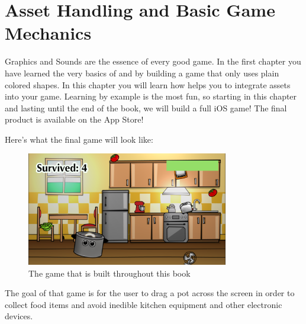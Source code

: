\chapter{Asset Handling and Basic Game Mechanics}

Graphics and Sounds are the essence of every good game. In the first chapter
you have learned the very basics of \SB{} and \cocos{} by building a game that only
uses plain colored shapes. In this chapter you will learn how \SB{} helps you to
integrate assets into your game. Learning by example is the most fun, so
starting in this chapter and lasting until the end of the book, we will build
a full iOS game! The final product is available on the App Store!%

Here's what the final game will look like:
\begin{figure}[H]
    \centering
    \includegraphics[width=250pt]{images/Chapter2/final_game.png}
    \caption{The game that is built throughout this book}
\end{figure}

The goal of that game is for the user to drag a pot across the screen in order
to collect food items and avoid inedible kitchen equipment and other electronic
devices.

